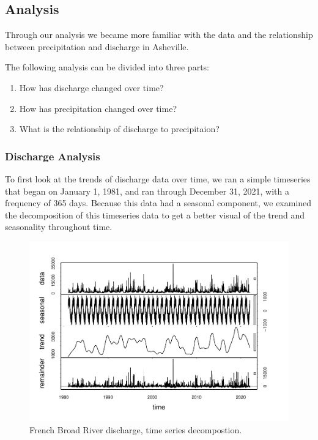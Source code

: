 \documentclass[
]{article}
\begin{document}
\newpage

\hypertarget{analysis}{%
\subsection{\texorpdfstring{\textbf{Analysis}}{Analysis}}\label{analysis}}

Through our analysis we became more familiar with the data and the
relationship between precipitation and discharge in Asheville.

The following analysis can be divided into three parts:

\begin{enumerate}
\def\labelenumi{\arabic{enumi}.}
\item
  How has discharge changed over time?
\item
  How has precipitation changed over time?
\item
  What is the relationship of discharge to precipitaion?
\end{enumerate}

\hypertarget{discharge-analysis}{%
\subsubsection{\texorpdfstring{\textbf{Discharge
Analysis}}{Discharge Analysis}}\label{discharge-analysis}}

To first look at the trends of discharge data over time, we ran a simple
timeseries that began on January 1, 1981, and ran through December 31,
2021, with a frequency of 365 days. Because this data had a seasonal
component, we examined the decomposition of this timeseries data to get
a better visual of the trend and seasonality throughout time.

\begin{figure}
\centering
\includegraphics{SD_AD_NVT_EDAfinal_files/figure-latex/unnamed-chunk-8-1.pdf}
\caption{French Broad River discharge, time series decompostion.}
\end{figure}
\end{document}
